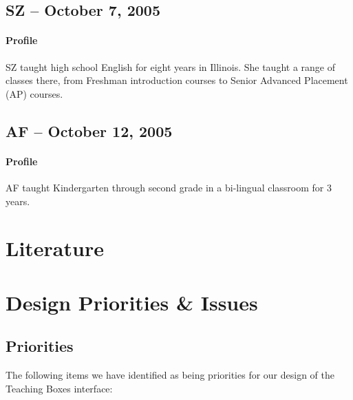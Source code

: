 \documentclass[12pt,titlepage]{article}
\begin{document}
\subsection{SZ -- October 7, 2005}
\paragraph{Profile} SZ taught high school English for eight years in Illinois.
She taught a range of classes there, from Freshman introduction courses to
Senior Advanced Placement (AP) courses.

\subsection{AF -- October 12, 2005}
\paragraph{Profile} AF taught Kindergarten through second grade in a bi-lingual
classroom for 3 years.

\section{Literature}

\section{Design Priorities \& Issues}
\subsection{Priorities}

The following items we have identified as being priorities for our design of
the Teaching Boxes interface:
\end{document}
